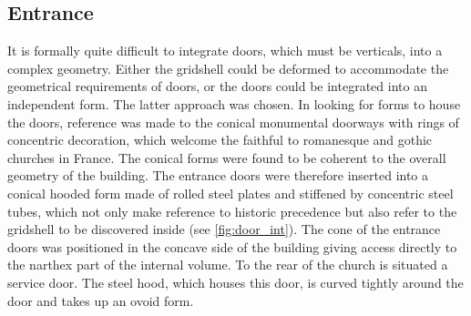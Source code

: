 \subsection{Entrance}
It is formally quite difficult to integrate doors, which must be verticals, into a complex geometry. Either the gridshell could be deformed to accommodate the geometrical requirements of doors, or the doors could be integrated into an independent form. The latter approach was chosen. In looking for forms to house the doors, reference was made to the conical monumental doorways with rings of concentric decoration, which welcome the faithful to romanesque and gothic churches in France. The conical forms were found to be coherent to the overall geometry of the building. The entrance doors were therefore inserted into a conical hooded form made of rolled steel plates and stiffened by concentric steel tubes, which not only make reference to historic precedence but also refer to the gridshell to be discovered inside (see \cref{fig:door_int}). The cone of the entrance doors was positioned in the concave side of the building giving access directly to the narthex part of the internal volume. To the rear of the church is situated a service door. The steel hood, which houses this door, is curved tightly around the door and takes up an ovoid form.



